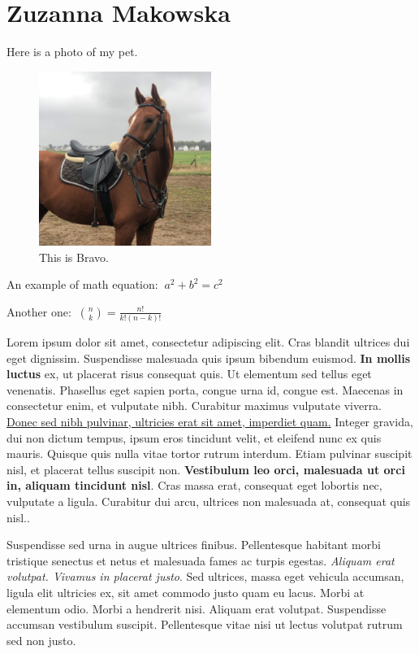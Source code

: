 
\section{Zuzanna Makowska}
\label{sec:zmakowska}

Here is a photo of my pet.

\begin{figure}[htbp]
    \centering
    \includegraphics[width=0.5\textwidth]{Pictures/1_ZMakowska_picture.jpg}
    \caption{This is Bravo.}
    \label{fig:Bravo}
   
\end{figure}

\vspace{1.0cm}



An example of math equation:
$ \ a^2+b^2=c^2 \ $

Another one:
$ \ \binom{n}{k}=\frac{n!}{k!(n-k)!} \ $
\vspace{1cm}

\setlength{\parindent}{10ex}
 {Lorem ipsum dolor sit amet, consectetur adipiscing elit. Cras blandit ultrices dui eget dignissim. Suspendisse malesuada quis ipsum bibendum euismod. \textbf{In mollis luctus} ex, ut placerat risus consequat quis. Ut elementum sed tellus eget venenatis. Phasellus eget sapien porta, congue urna id, congue est. Maecenas in consectetur enim, et vulputate nibh. Curabitur maximus vulputate viverra. \underline{Donec sed nibh pulvinar, ultricies erat sit amet, imperdiet quam.} Integer gravida, dui non dictum tempus, ipsum eros tincidunt velit, et eleifend nunc ex quis mauris. Quisque quis nulla vitae tortor rutrum interdum. Etiam pulvinar suscipit nisl, et placerat tellus suscipit non. \textbf{Vestibulum leo orci, malesuada ut orci in, aliquam tincidunt nisl}. Cras massa erat, consequat eget lobortis nec, vulputate a ligula. Curabitur dui arcu, ultrices non malesuada at, consequat quis nisl.}.\par
\setlength{\parindent}{10ex}
 {Suspendisse sed urna in augue ultrices finibus. Pellentesque habitant morbi tristique senectus et netus et malesuada fames ac turpis egestas. \textit{Aliquam erat volutpat. Vivamus in placerat justo}. Sed ultrices, massa eget vehicula accumsan, ligula elit ultricies ex, sit amet commodo justo quam eu lacus. Morbi at elementum odio. Morbi a hendrerit nisi. Aliquam erat volutpat. Suspendisse accumsan vestibulum suscipit. Pellentesque vitae nisi ut lectus volutpat rutrum sed non justo.}
 

